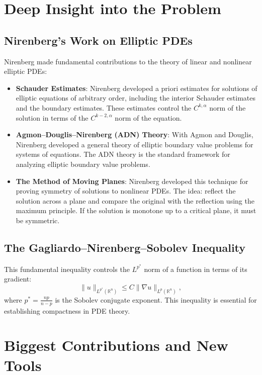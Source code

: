\section{Deep Insight into the Problem}

\subsection{Nirenberg's Work on Elliptic PDEs}

Nirenberg made fundamental contributions to the theory of linear and nonlinear elliptic PDEs:
\begin{itemize}
\item \textbf{Schauder Estimates}: Nirenberg developed a priori estimates for solutions of elliptic equations of arbitrary order, including the interior Schauder estimates and the boundary estimates. These estimates control the $C^{k,\alpha}$ norm of the solution in terms of the $C^{k-2,\alpha}$ norm of the equation.
\item \textbf{Agmon--Douglis--Nirenberg (ADN) Theory}: With Agmon and Douglis, Nirenberg developed a general theory of elliptic boundary value problems for systems of equations. The ADN theory is the standard framework for analyzing elliptic boundary value problems.
\item \textbf{The Method of Moving Planes}: Nirenberg developed this technique for proving symmetry of solutions to nonlinear PDEs. The idea: reflect the solution across a plane and compare the original with the reflection using the maximum principle. If the solution is monotone up to a critical plane, it must be symmetric.
\end{itemize}

\subsection{The Gagliardo--Nirenberg--Sobolev Inequality}

This fundamental inequality controls the $L^{p^*}$ norm of a function in terms of its gradient:
\[
\|u\|_{L^{p^*}(\mathbb{R}^n)} \leq C \|\nabla u\|_{L^p(\mathbb{R}^n)},
\]
where $p^* = \frac{np}{n-p}$ is the Sobolev conjugate exponent. This inequality is essential for establishing compactness in PDE theory.

\section{Biggest Contributions and New Tools}

